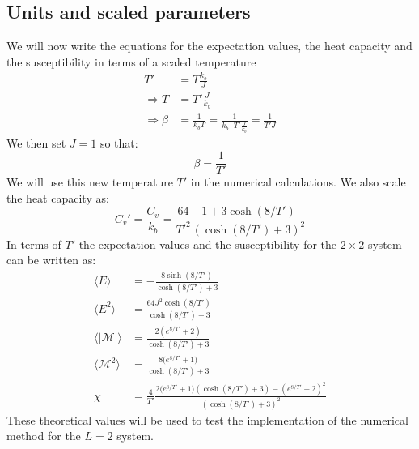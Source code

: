 \documentclass[11pt,a4wide]{article}
\begin{document}
\subsection{Units and scaled parameters}
We will now write the equations for the expectation values, the heat capacity and the susceptibility in terms of a scaled temperature
\begin{align*}
T' &= T \frac{k_b}{J} \\
\Rightarrow T &= T'\frac{J}{k_b}\\
\Rightarrow \beta &= \frac{1}{k_bT} = \frac{1}{k_b\cdot T'\frac{J}{k_b}} = \frac{1}{T'J}
\end{align*}
We then set $J=1$ so that:
\[
\beta = \frac{1}{T'}
\]
We will use this new temperature $T'$ in the numerical calculations. We also scale the heat capacity as:
\[
C_v' = \frac{C_v}{k_b} = \frac{64}{T'^2} \frac{1 + 3\cosh(8/T')}{(\cosh(8/T') + 3)^2} 
\]
In terms of $T'$ the expectation values and the susceptibility for the $2\times 2$ system can be written as:
\begin{align}
\langle E \rangle &= -\frac{8\sinh(8/T')}{\cosh(8/T') + 3} \\
\langle E^2 \rangle &=\frac{64J^2 \cosh(8/T')}{\cosh(8/T') + 3} \\
\langle |\mathcal{M}| \rangle &= \frac{2(e^{8/T'}+ 2)}{\cosh(8/T') + 3}\\
\langle \mathcal{M}^2 \rangle &= \frac{8\big(e^{8/T'} + 1\big)}{\cosh(8/T') + 3} \\
\chi &= \frac{4}{T'} \frac{2(e^{8/T'} + 1\big)(\cosh(8/T') + 3) - (e^{8/T'}+ 2)^2}{(\cosh(8/T') + 3)^2} 
\end{align}
These theoretical values will be used to test the implementation of the numerical method for the $L=2$ system. 
\end{document}
